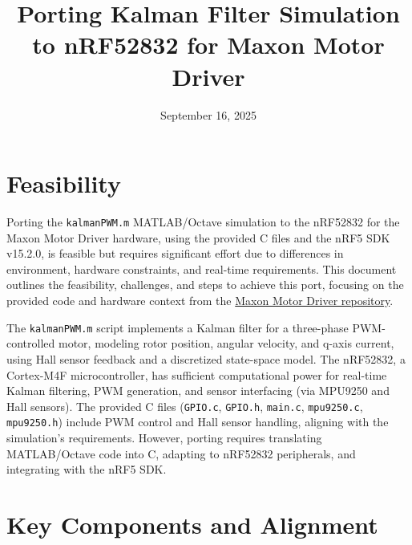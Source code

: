 \documentclass[a4paper,11pt]{article}
\title{Porting Kalman Filter Simulation to nRF52832 for Maxon Motor Driver}
\author{}
\date{September 16, 2025}
\begin{document}
\maketitle
\tableofcontents
\newpage

\section{Feasibility}
Porting the \texttt{kalmanPWM.m} MATLAB/Octave simulation to the nRF52832 for the Maxon Motor Driver hardware, using the provided C files and the nRF5 SDK v15.2.0, is feasible but requires significant effort due to differences in environment, hardware constraints, and real-time requirements. This document outlines the feasibility, challenges, and steps to achieve this port, focusing on the provided code and hardware context from the \href{https://github.com/cydrollinger/maxon-motor-driver}{Maxon Motor Driver repository}.

The \texttt{kalmanPWM.m} script implements a Kalman filter for a three-phase PWM-controlled motor, modeling rotor position, angular velocity, and q-axis current, using Hall sensor feedback and a discretized state-space model. The nRF52832, a Cortex-M4F microcontroller, has sufficient computational power for real-time Kalman filtering, PWM generation, and sensor interfacing (via MPU9250 and Hall sensors). The provided C files (\texttt{GPIO.c}, \texttt{GPIO.h}, \texttt{main.c}, \texttt{mpu9250.c}, \texttt{mpu9250.h}) include PWM control and Hall sensor handling, aligning with the simulation's requirements. However, porting requires translating MATLAB/Octave code into C, adapting to nRF52832 peripherals, and integrating with the nRF5 SDK.

\section{Key Components and Alignment}
\end{document}
